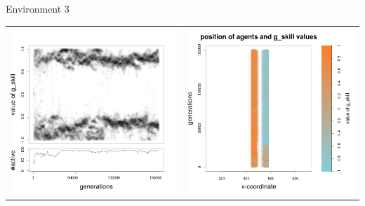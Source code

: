 \documentclass[8pt, handout=show,notes=show]{beamer}
\begin{document}
\begin{frame}{Environment 3}

\begin{table}[H]
\centering
\begin{tabular}{cc}
\includegraphics[width=\imgSize]{../images/5StaticEnv/Gplot5_staticEnv3}&\includegraphics[width=\imgSize]{../images/5StaticEnv/Gplot5Static_staticEnv3}\\

\end{tabular}
\end{table}
\end{frame}
\end{document}
